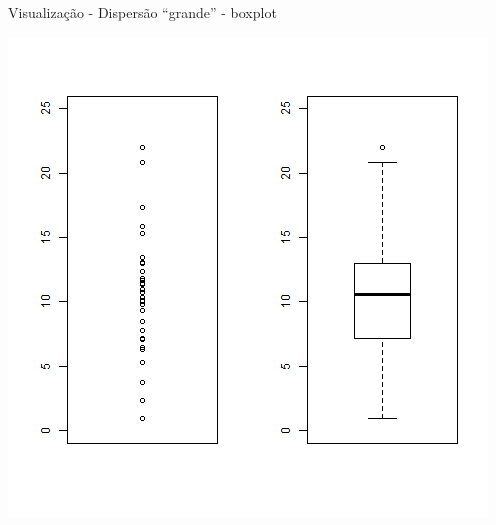 \documentclass{beamer}
\begin{document}
\begin{frame}{\small Visualização - Dispersão ``grande'' - boxplot}
  \begin{center}
    \includegraphics[height=.8\textheight]{Cap17/dot-box-G}
  \end{center}
\end{frame}

\end{document}
